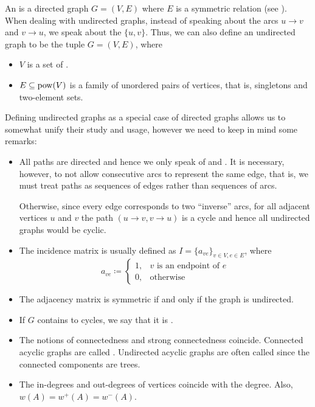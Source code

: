 \begin{definition}\label{def:undirected_graph}
  An  is a directed graph \( G = (V, E) \) where \( E \) is a symmetric relation (see ). When dealing with undirected graphs, instead of speaking about the arcs \( u \to v \) and \( v \to u \), we speak about the  \( \{ u, v \} \). Thus, we can also define an undirected graph to be the tuple \( G = (V, E) \), where
  \begin{itemize}
    \item \( V \) is a set of .
    \item \( E \subseteq \operatorname{pow}(V) \) is a family of unordered pairs of vertices, that is, singletons and two-element sets.
  \end{itemize}

  Defining undirected graphs as a special case of directed graphs allows us to somewhat unify their study and usage, however we need to keep in mind some remarks:
  \begin{itemize}
    \item All paths are directed and hence we only speak of  and . It is necessary, however, to not allow consecutive arcs to represent the same edge, that is, we must treat paths as sequences of edges rather than sequences of arcs.

    Otherwise, since every edge corresponds to two \enquote{inverse} arcs, for all adjacent vertices \( u \) and \( v \) the path \( (u \to v, v \to u) \) is a cycle and hence all undirected graphs would be cyclic.

    \item The incidence matrix is usually defined as \( I = \{ a_{ve} \}_{v \in V, e \in E} \), where
    \begin{equation*}
      a_{ve} \coloneqq \begin{cases}
        1, &v \text{ is an endpoint of } e \\
        0, &\text{otherwise}
      \end{cases}
    \end{equation*}

    \item The adjacency matrix is symmetric if and only if the graph is undirected.

    \item If \( G \) contains to cycles, we say that it is .

    \item The notions of connectedness and strong connectedness coincide. Connected acyclic graphs are called . Undirected acyclic graphs are often called  since the connected components are trees.

    \item The in-degrees and out-degrees of vertices coincide with the degree. Also, \( w(A) = w^+(A) = w^-(A) \).
  \end{itemize}
\end{definition}

